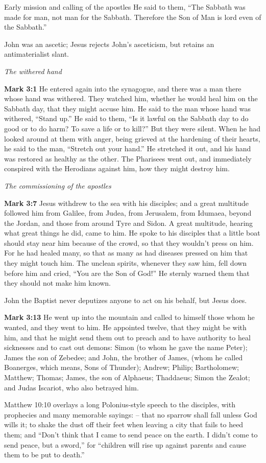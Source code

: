 \documentclass[10pt,twoside]{book}
\newcommand{\quotesize}{\normalsize{}}
\newcommand{\comm}[1]{\begingroup \color{black!50} #1\endgroup}
\newenvironment{quotetext}{\begingroup\quotesize}{\endgroup}
\newcommand{\bible}[2]{\begin{quotetext}\textbf{#1} #2\end{quotetext}}
\newcommand{\gospelmark}[2]{\bible{Mark #1}{#2}}
\newcommand{\subhead}[1]{\emph{#1}\par}
\begin{document}
\begin{section}{Early mission and calling of the apostles}
{  He said to them, ``The Sabbath was made for man, not man for the Sabbath.    Therefore the Son of Man is lord even of the Sabbath.'' 
}

\comm{
John was an ascetic;
Jesus rejects John's asceticism, but retains an antimaterialist slant.
}

\subhead{The withered hand}

\gospelmark{3:1}{
He entered again into the synagogue, and there was a man there whose hand was withered.   They watched him, whether he would heal him on the Sabbath day, that they might accuse him.   He said to the man whose hand was withered, ``Stand up.''   He said to them, ``Is it lawful on the Sabbath day to do good or to do harm? To save a life or to kill?'' But they were silent.   When he had looked around at them with anger, being grieved at the hardening of their hearts, he said to the man, ``Stretch out your hand.'' He stretched it out, and his hand was restored as healthy as the other.   The Pharisees went out, and immediately conspired with the Herodians against him, how they might destroy him.}

\subhead{The commissioning of the apostles}

\gospelmark{3:7}{
  Jesus withdrew to the sea with his disciples; and a great multitude followed him from Galilee, from Judea,   from Jerusalem, from Idumaea, beyond the Jordan, and those from around Tyre and Sidon. A great multitude, hearing what great things he did, came to him.   He spoke to his disciples that a little boat should stay near him because of the crowd, so that they wouldn't press on him.   For he had healed many, so that as many as had diseases pressed on him that they might touch him.   The unclean spirits, whenever they saw him, fell down before him and cried, ``You are the Son of God!''   He sternly warned them that they should not make him known.
}

\comm{
John the Baptist never deputizes anyone to act on his behalf, but Jesus does.
}

\gospelmark{3:13}{
  He went up into the mountain and called to himself those whom he wanted, and they went to him.   He appointed twelve, that they might be with him, and that he might send them out to preach   and to have authority to heal sicknesses and to cast out demons:   Simon (to whom he gave the name Peter);   James the son of Zebedee; and John, the brother of James, (whom he called Boanerges, which means, Sons of Thunder);   Andrew; Philip; Bartholomew; Matthew; Thomas; James, the son of Alphaeus; Thaddaeus; Simon the Zealot;   and Judas Iscariot, who also betrayed him. 
}

\comm{
Matthew 10:10 overlays a long Polonius-style speech to the disciples, with prophecies and many memorable sayings: --
that no sparrow shall fall unless God wills it; to shake the dust off their feet when leaving a city that fails
to heed them; and
``Don't think that I came to send peace on the earth. I didn't come to send peace, but a sword,''
for ``children will rise up against parents and cause them to be put to death.''
}

\end{section}
\end{document}
